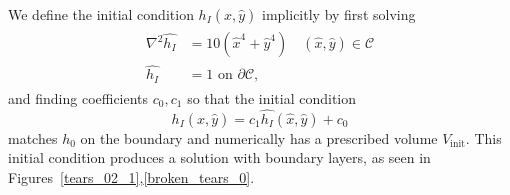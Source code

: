 We define the initial condition $h_I(\hat{x},\hat{y})$ implicitly by first solving
\begin{align}
\begin{aligned}
\nabla^2 \hat{h_I} &= 10 (\hat{x}^4 +\hat{y}^4) \quad (\hat{x},\hat{y}) \in \mathcal{C} \\
\hat{h_I} &= 1 \mbox{ on } \partial \mathcal{C},
\end{aligned} 
\end{align}
and finding coefficients $c_0,c_1$ so that the initial condition
\begin{equation}
h_I(\hat{x},\hat{y}) = c_1 \hat{h_I}(\hat{x},\hat{y})+c_0
\end{equation}
matches $h_0$ on the boundary and numerically has a prescribed volume $V_{\mbox{init}}$. This initial condition produces a solution with boundary layers, as seen in Figures~\ref{tears_02_1},\ref{broken_tears_0}.